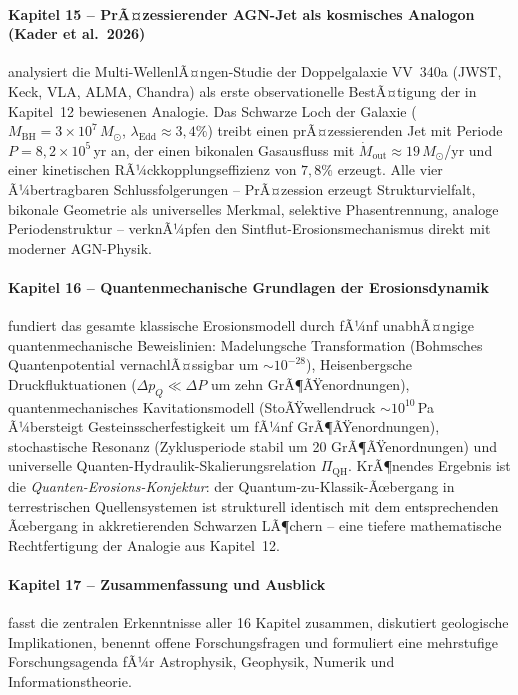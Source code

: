 ﻿\documentclass[12pt,a4paper]{report}
\begin{document}
\paragraph{Kapitel 15 -- PrÃ¤zessierender AGN-Jet als kosmisches Analogon (Kader et al.\ 2026)}
analysiert die Multi-WellenlÃ¤ngen-Studie der Doppelgalaxie VV~340a (JWST, Keck, VLA, ALMA, Chandra) als erste observationelle BestÃ¤tigung der in Kapitel~12 bewiesenen Analogie. Das Schwarze Loch der Galaxie ($M_\mathrm{BH} = 3\times10^7\,M_\odot$, $\lambda_\mathrm{Edd} \approx 3{,}4\%$) treibt einen prÃ¤zessierenden Jet mit Periode $P = 8{,}2 \times 10^5$\,yr an, der einen bikonalen Gasausfluss mit $\dot{M}_\mathrm{out} \approx 19\,M_\odot$/yr und einer kinetischen RÃ¼ckkopplungseffizienz von $7{,}8\%$ erzeugt. Alle vier Ã¼bertragbaren Schlussfolgerungen -- PrÃ¤zession erzeugt Strukturvielfalt, bikonale Geometrie als universelles Merkmal, selektive Phasentrennung, analoge Periodenstruktur -- verknÃ¼pfen den Sintflut-Erosionsmechanismus direkt mit moderner AGN-Physik.

\paragraph{Kapitel 16 -- Quantenmechanische Grundlagen der Erosionsdynamik}
fundiert das gesamte klassische Erosionsmodell durch fÃ¼nf unabhÃ¤ngige quantenmechanische Beweislinien: Madelungsche Transformation (Bohmsches Quantenpotential vernachlÃ¤ssigbar um $\sim10^{-28}$), Heisenbergsche Druckfluktuationen ($\Delta p_Q \ll \Delta P$ um zehn GrÃ¶ÃŸenordnungen), quantenmechanisches Kavitationsmodell (StoÃŸwellendruck $\sim10^{10}$\,Pa Ã¼bersteigt Gesteinsscherfestigkeit um fÃ¼nf GrÃ¶ÃŸenordnungen), stochastische Resonanz (Zyklusperiode stabil um 20 GrÃ¶ÃŸenordnungen) und universelle Quanten-Hydraulik-Skalierungsrelation $\Pi_\mathrm{QH}$. KrÃ¶nendes Ergebnis ist die \textit{Quanten-Erosions-Konjektur}: der Quantum-zu-Klassik-Ãœbergang in terrestrischen Quellensystemen ist strukturell identisch mit dem entsprechenden Ãœbergang in akkretierenden Schwarzen LÃ¶chern -- eine tiefere mathematische Rechtfertigung der Analogie aus Kapitel~12.

\paragraph{Kapitel 17 -- Zusammenfassung und Ausblick}
fasst die zentralen Erkenntnisse aller 16 Kapitel zusammen, diskutiert geologische Implikationen, benennt offene Forschungsfragen und formuliert eine mehrstufige Forschungsagenda fÃ¼r Astrophysik, Geophysik, Numerik und Informationstheorie.
\end{document}
